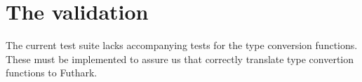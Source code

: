 \section{The \fshark{} validation}
The current \fshark{} test suite lacks accompanying tests for the \fshark{} type
conversion functions. These must be implemented to assure us that \fshark{}
correctly translate type convertion functions to Futhark.


